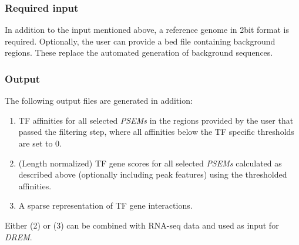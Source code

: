\documentclass{article}
\begin{document}
\subsubsection{Required input}
In addition to the input mentioned above, a reference genome in 2bit format is required. 
Optionally, the user can provide a bed file containing background regions. 
These replace the automated generation of background sequences. 

\subsubsection{Output}
The following output files are generated in addition:
\begin{enumerate}
\item TF affinities for all selected \textit{PSEMs} in the regions provided by the user that passed the filtering step, where all affinities below the TF specific thresholds are set to 0.
\item (Length normalized) TF gene scores for all selected \textit{PSEMs} calculated as described above (optionally including peak features) using the thresholded affinities.
\item A sparse representation of TF gene interactions.
\end{enumerate}

Either (2) or (3) can be combined with RNA-seq data and used as input for \textit{DREM}.
\newpage


\end{document}
